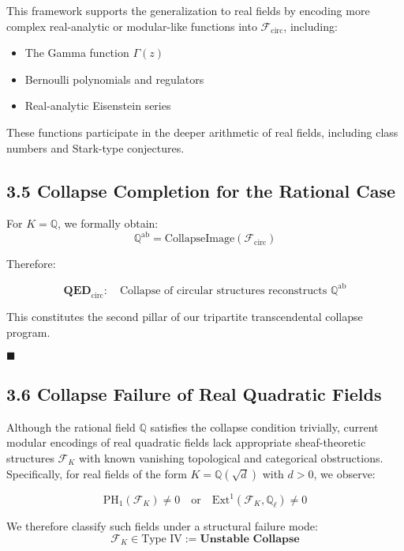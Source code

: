 \documentclass[11pt]{article}
\begin{document}
This framework supports the generalization to real fields by encoding more complex real-analytic or modular-like functions into \( \mathcal{F}_{\mathrm{circ}} \), including:
\begin{itemize}
    \item The Gamma function \( \Gamma(z) \)
    \item Bernoulli polynomials and regulators
    \item Real-analytic Eisenstein series
\end{itemize}

These functions participate in the deeper arithmetic of real fields, including class numbers and Stark-type conjectures.

\subsection{3.5 Collapse Completion for the Rational Case}

For \( K = \mathbb{Q} \), we formally obtain:
\[
\mathbb{Q}^{\mathrm{ab}} = \text{CollapseImage}(\mathcal{F}_{\mathrm{circ}})
\]

Therefore:

\[
\textbf{QED}_{\mathrm{circ}}: \quad \text{Collapse of circular structures reconstructs } \mathbb{Q}^{\mathrm{ab}}
\]

This constitutes the second pillar of our tripartite transcendental collapse program.

\hfill $\blacksquare$

\subsection{3.6 Collapse Failure of Real Quadratic Fields}
\label{subsec:collapse-failure-rqf}

Although the rational field \( \mathbb{Q} \) satisfies the collapse condition trivially, current modular encodings of real quadratic fields lack appropriate sheaf-theoretic structures \( \mathcal{F}_K \) with known vanishing topological and categorical obstructions. Specifically, for real fields of the form \( K = \mathbb{Q}(\sqrt{d}) \) with \( d > 0 \), we observe:

\begin{equation}
\mathrm{PH}_1(\mathcal{F}_K) \neq 0 \quad \text{or} \quad \mathrm{Ext}^1(\mathcal{F}_K, \mathbb{Q}_\ell) \neq 0
\end{equation}

We therefore classify such fields under a structural failure mode:
\[
\mathcal{F}_K \in \text{Type IV} := \textbf{Unstable Collapse}
\]
\end{document}
